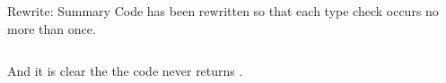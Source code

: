\begin{frame}{Rewrite: Summary}
  Code has been rewritten so that each type check occurs no more than once.

  \begin{columns}
    \begin{column}{0.5\textwidth}
      \usebox\typecaseAbox
    \end{column}
    \begin{column}{0.5\textwidth}  %
      \usebox\typecaseKbox
    \end{column}
  \end{columns}

  And it is clear the the code never returns .

\end{frame}


